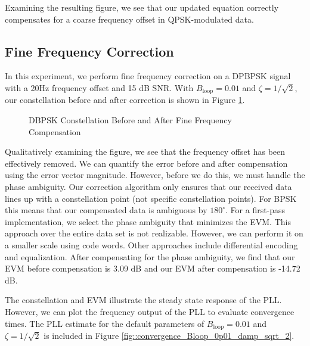 \documentclass{article}
\begin{document}
\noindent Examining the resulting figure, we see that our updated equation correctly compensates for a coarse frequency offset in QPSK-modulated data.

\subsection{Fine Frequency Correction}

In this experiment, we perform fine frequency correction on a DPBPSK signal with a 20Hz frequency offset and 15 dB SNR. With $B_\text{loop} = 0.01$ and $\zeta = 1/\sqrt{2}$, our constellation before and after correction is shown in Figure \ref{fig::fine_freq_comp_bpsk_const}.

\begin{figure}[H]
	\centerline{}
	\caption{DBPSK Constellation Before and After Fine Frequency Compensation}
	\label{fig::fine_freq_comp_bpsk_const}
\end{figure}

\noindent Qualitatively examining the figure, we see that the frequency offset has been effectively removed. We can quantify the error before and after compensation using the error vector magnitude. However, before we do this, we must handle the phase ambiguity. Our correction algorithm only ensures that our received data lines up with a constellation point (not specific constellation points). For BPSK this means that our compensated data is ambiguous by $180^{\circ}$. For a first-pass implementation, we select the phase ambiguity that minimizes the EVM. This approach over the entire data set is not realizable. However, we can perform it on a smaller scale using code words. Other approaches include differential encoding and equalization. After compensating for the phase ambiguity, we find that our EVM before compensation is 3.09 dB and our EVM after compensation is -14.72 dB.

  The constellation and EVM illustrate the steady state response of the PLL. However, we can plot the frequency output of the PLL to evaluate convergence times. The PLL estimate for the default parameters of $B_\text{loop} = 0.01$ and $\zeta = 1/\sqrt{2}$ is included in Figure \ref{fig::convergence_Bloop_0p01_damp_sqrt_2}.
\end{document}
